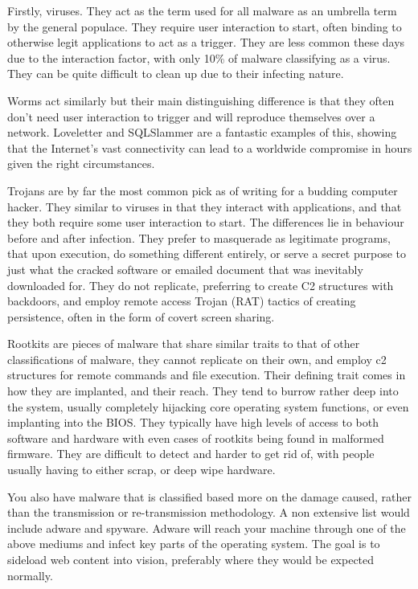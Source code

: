 Firstly, viruses. They act as the term used for all malware as an umbrella term by the general populace.
They require user interaction to start, often binding to otherwise legit applications to act as a trigger. They are less common these days due to the interaction factor, with only 10\% of malware classifying as a virus. They can be quite difficult to clean up due to their infecting nature. \citep{MalwareClass}

Worms act similarly but their main distinguishing difference is that they often don't need user interaction to trigger and will reproduce themselves over a network. Loveletter and SQLSlammer are a fantastic examples of this, showing that the Internet's vast connectivity
can lead to a worldwide compromise in hours given the right circumstances. \citep{MalwareClass} 

Trojans are by far the most common pick as of writing for a budding computer hacker. They similar to viruses in that they interact with applications, and that they both require some user interaction to start. The differences lie in behaviour before and after infection. 
They prefer to masquerade as legitimate programs, that upon execution, do something different entirely, or serve a secret purpose to just what the cracked software or emailed document that was inevitably downloaded for. They do not replicate, preferring to create C2 structures with backdoors,
and employ remote access Trojan (RAT) tactics of creating persistence, often in the form of covert screen sharing. \citep{virusVsTrojan}


Rootkits are pieces of malware that share similar traits to that of other classifications of malware, they cannot replicate on their own, and employ c2 structures for remote commands and file execution. 
Their defining trait comes in how they are implanted, and their reach. They tend to burrow rather deep into the system, usually completely hijacking core operating system functions, or even implanting into the BIOS.
They typically have high levels of access to both software and hardware with even cases of rootkits being found in malformed firmware. They are difficult to detect and harder to get rid of, with people usually having to either scrap, or deep
wipe hardware. \cite{MalwareClass02} 

You also have malware that is classified based more on the damage caused, rather than the transmission or re-transmission methodology. A non extensive list would include adware and spyware. Adware will reach your machine through one of the above mediums
and infect key parts of the operating system. The goal is to sideload web content into vision, preferably where they would be expected normally. 

